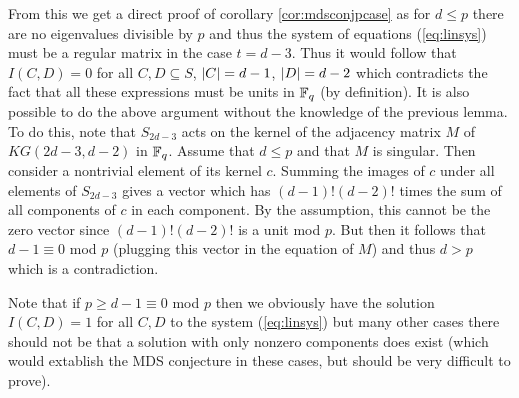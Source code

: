 \documentclass[a4paper]{article}
\begin{document}
From this we get a direct proof of corollary \ref{cor:mdsconjpcase} as for $d\leq p$ there are no eigenvalues divisible by $p$ and thus the system of equations (\ref{eq:linsys}) must be a regular matrix in the case $t=d-3$. Thus it would follow that $I(C,D)=0$ for all $C,D\subseteq S$, $\left|C\right|=d-1$, $\left|D\right|=d-2$ which contradicts the fact that all these expressions must be units in $\mathbb{F}_{q}$ (by definition).
It is also possible to do the above argument without the knowledge of the previous lemma. To do this, note that $S_{2d-3}$ acts on the kernel of the adjacency matrix $M$ of $KG(2d-3,d-2)$ in $\mathbb{F}_{q}$. Assume that $d\leq p$ and that $M$ is singular. Then consider a nontrivial element of its kernel $c$. Summing the images of $c$ under all elements of $S_{2d-3}$ gives a vector which has $(d-1)!(d-2)!$ times the sum of all components of $c$ in each component. By the assumption, this cannot be the zero vector since $(d-1)!(d-2)!$ is a unit mod $p$. But then it follows that $d-1\equiv 0$ mod $p$ (plugging this vector in the equation of $M$) and thus $d>p$ which is a contradiction.   

\begin{remark}
  Note that if $p\geq d-1\equiv 0$ mod $p$ then we obviously have the solution $I(C,D)=1$ for all $C,D$ to the system (\ref{eq:linsys}) but many other cases there should not be that a solution with only nonzero components does exist (which would extablish the MDS conjecture in these cases, but should be very difficult to prove).
\end{remark}
\end{document}
